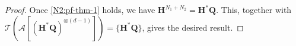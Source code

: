 \documentclass{article}
\theoremstyle{plain}
\theoremstyle{definition}
\theoremstyle{remark}
\newcommand{\BH}{\bm{H}}
\newcommand{\BQ}{\bm{Q}}
\newcommand{\ACal}{\mathcal{A}}
\begin{document}
\begin{appendix}
\begin{center}
\begin{proof}
    Once \eqref{N2:pf-thm-1} holds, we have $\BH^{N_1+N_2}=\BH^* \BQ$. This, together with $\mathcal{T}\left(\ACal[(\BH^*\BQ)^{\otimes(d-1)}]\right) = \{\BH^*\BQ\}$, gives the desired result.
\end{proof}
		
	\end{center}
	\vspace{-0.1in}
	\setcounter{section}{0}
\end{appendix}
\end{document}
